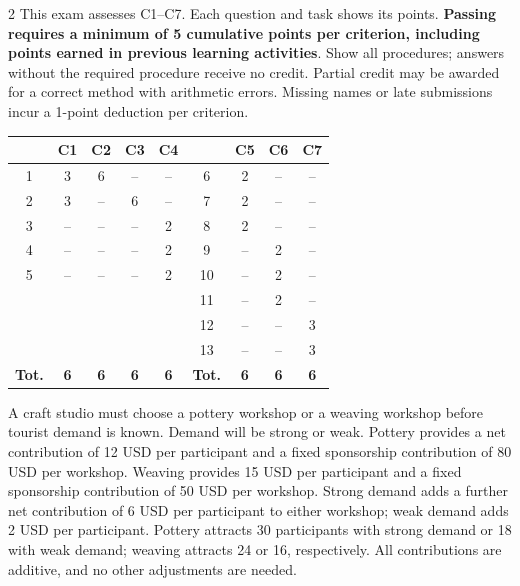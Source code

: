 \StudentInfo \vspace{-3mm}

\begin{multicols}{2}
\raggedcolumns
{}
This exam assesses C1--C7. Each question and task shows its points. \textbf{Passing requires a minimum of 5 cumulative points per criterion, including points earned in previous learning activities}. Show all procedures; answers without the required procedure receive no credit. Partial credit may be awarded for a correct method with arithmetic errors. Missing names or late submissions incur a 1-point deduction per criterion.


\begin{center}
	\small\setlength{\tabcolsep}{5pt}
	\begin{tabular}{|c|c|c|c|c||c|c|c|c|}
		\hline
		\textbf{\textnumero}&\textbf{C1}&\textbf{C2}&\textbf{C3}&\textbf{C4}&
		\textbf{\textnumero}&\textbf{C5}&\textbf{C6}&\textbf{C7}\\\hline
		1&3&6&--&--&6&2&--&--\\\hline
		2&3&--&6&--&7&2&--&--\\\hline
		3&--&--&--&2&8&2&--&--\\\hline
		4&--&--&--&2&9&--&2&--\\\hline
		5&--&--&--&2&10&--&2&--\\\hline
		&&&&&11&--&2&--\\\hline
		&&&&&12&--&--&3\\\hline
		&&&&&13&--&--&3\\\hline
		\textbf{Tot.}&\textbf{6}&\textbf{6}&\textbf{6}&\textbf{6}&
		\textbf{Tot.}&\textbf{6}&\textbf{6}&\textbf{6}\\\hline
	\end{tabular}
\end{center}


\begin{minipage}{\linewidth}
A craft studio must choose a pottery workshop or a weaving workshop before tourist demand is known. Demand will be strong or weak. Pottery provides a net contribution of 12 USD per participant and a fixed sponsorship contribution of 80 USD per workshop. Weaving provides 15 USD per participant and a fixed sponsorship contribution of 50 USD per workshop. Strong demand adds a further net contribution of 6 USD per participant to either workshop; weak demand adds 2 USD per participant. Pottery attracts 30 participants with strong demand or 18 with weak demand; weaving attracts 24 or 16, respectively. All contributions are additive, and no other adjustments are needed.


\end{minipage}
\end{multicols}
